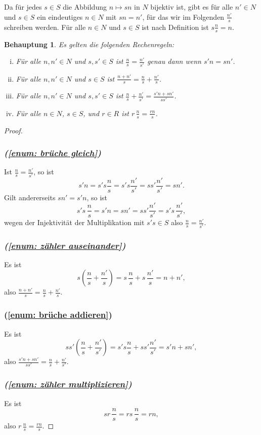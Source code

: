 \documentclass[a4paper,10pt]{article}
\newcounter{satze}
\newtheorem{beh}[satze]{Behauptung}
\theoremstyle{definition}
\begin{document}
\subsection{}
Da für jedes $s \in S$ die Abbildung $n \mapsto s n$ in $N$ bijektiv ist, gibt es für alle $n' \in N$ und $s \in S$ ein eindeutiges $n \in N$ mit $sn = n'$, für das wir im Folgenden $\frac{n'}{s}$ schreiben werden. Für alle $n \in N$ und $s \in S$ ist nach Definition ist $s \frac{n}{s} = n$.

\begin{beh}
 Es gelten die folgenden Rechenregeln:
 \begin{enumerate}[(i)]
  \item Für alle $n, n' \in N$ und $s, s' \in S$ ist $\frac{n}{s} = \frac{n'}{s'}$ genau dann wenn $s'n = sn'$. \label{enum: brüche gleich}
  \item Für alle $n, n' \in N$ und $s \in S$ ist $\frac{n+n'}{s} = \frac{n}{s} + \frac{n'}{s}$. \label{enum: zähler auseinander}
  \item Für alle $n, n' \in N$ und $s, s' \in S$ ist $\frac{n}{s} + \frac{n'}{s'} = \frac{s'n + sn'}{ss'}$. \label{enum: brüche addieren}
  \item Für alle $n \in N$, $s \in S$, und $r \in R$ ist $r\, \frac{n}{s} = \frac{rn}{s}$. \label{enum: zähler multiplizieren}
 \end{enumerate}
\end{beh}
\begin{proof}
 \subsubsection*{\emph{(\ref{enum: brüche gleich})}}
 Ist $\frac{n}{s} = \frac{n'}{s'}$, so ist
 \[
  s'n = s's\frac{n}{s} = s's\frac{n'}{s'} = ss'\frac{n'}{s'} = sn'.
 \]
 Gilt andererseits $sn' = s'n$, so ist
 \[
  s's \, \frac{n}{s} = s'n = sn' = ss'\frac{n'}{s'} = s's \, \frac{n'}{s'},
 \]
 wegen der Injektivität der Multiplikation mit $s's \in S$ also $\frac{n}{s} = \frac{n'}{s'}$.
 \subsubsection*{\emph{(\ref{enum: zähler auseinander})}}
 Es ist
 \[
  s\left( \frac{n}{s} + \frac{n'}{s} \right)
  = s \, \frac{n}{s} + s \, \frac{n'}{s}
  = n + n',
 \]
 also $\frac{n+n'}{s} = \frac{n}{s} + \frac{n'}{s}$.
 \subsubsection*{\emph{}(\ref{enum: brüche addieren})}
 Es ist
 \[
  ss' \left( \frac{n}{s} + \frac{n'}{s'} \right)
  = s' s \frac{n}{s} + s s' \frac{n'}{s'}
  = s' n + s n',
 \]
 also $\frac{s' n + s n'}{ss'} = \frac{n}{s} + \frac{n'}{s'}$.
 \subsubsection*{\emph{(\ref{enum: zähler multiplizieren})}}
 Es ist
 \[
  s r \, \frac{n}{s}
  = r s \, \frac{n}{s}
  = rn,
 \]
 also $r \, \frac{n}{s} = \frac{rn}{s}$.
\end{proof}
\end{document}
